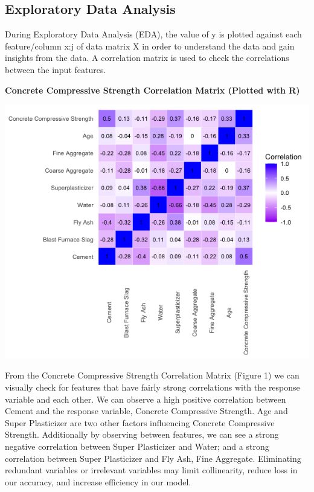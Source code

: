 \documentclass{article}
\begin{document}
	\subsection{Exploratory Data Analysis}
	During Exploratory Data Analysis (EDA), the value of y is plotted against each feature/column x:j of data matrix X 
	in order to understand the data and gain insights from the data. A correlation matrix is used to check the correlations 
	between the input features.
	
	\textbf{ Concrete Compressive Strength Correlation Matrix (Plotted with R)}
	
	\includegraphics[scale=0.7]{../plots/ConcreteCompressiveStrength/concrete-corr.png}

	From the Concrete Compressive Strength Correlation Matrix (Figure 1) we can visually check for features that have 
	fairly strong correlations with the response variable and each other. We can observe a high positive correlation 
	between Cement and the response variable, Concrete Compressive Strength. Age and Super Plasticizer are two other 
	factors influencing Concrete Compressive Strength. Additionally by observing between features, we can see a strong 
	negative correlation between Super Plasticizer and Water; and a strong correlation between Super Plasticizer and Fly 
	Ash, Fine Aggregate. Eliminating redundant variables or irrelevant variables may limit collinearity, reduce loss in 
	our accuracy, and increase efficiency in our model.	

	\newpage 
\end{document}
